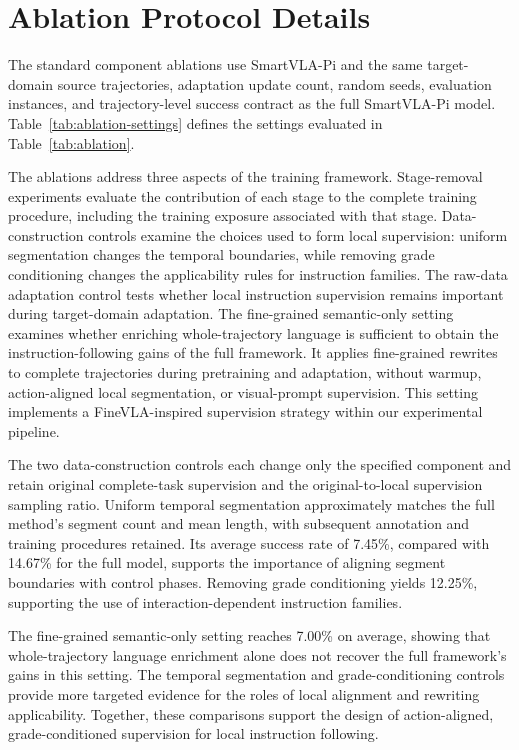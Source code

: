\section{Ablation Protocol Details}
\label{appendix:ablation-details}

The standard component ablations use SmartVLA-Pi and the same
target-domain source trajectories, adaptation update count,
random seeds, evaluation instances, and trajectory-level success
contract as the full SmartVLA-Pi model. Table~\ref{tab:ablation-settings}
defines the settings evaluated in Table~\ref{tab:ablation}.

The ablations address three aspects of the training framework.
Stage-removal experiments evaluate the contribution of each
stage to the complete training procedure, including the training
exposure associated with that stage. Data-construction controls
examine the choices used to form local supervision: uniform
segmentation changes the temporal boundaries, while removing
grade conditioning changes the applicability rules for instruction
families. The raw-data adaptation control tests whether local
instruction supervision remains important during target-domain
adaptation. The fine-grained semantic-only setting examines whether
enriching whole-trajectory language is sufficient to obtain the
instruction-following gains of the full framework. It applies
fine-grained rewrites to complete trajectories during pretraining
and adaptation, without warmup, action-aligned local segmentation,
or visual-prompt supervision. This setting implements a
FineVLA-inspired supervision strategy within our experimental
pipeline.

%

The two data-construction controls each change only the specified
component and retain original complete-task supervision and the
original-to-local supervision sampling ratio. Uniform temporal
segmentation approximately matches the full method's segment
count and mean length, with subsequent annotation and training
procedures retained. Its average success rate of 7.45\%, compared
with 14.67\% for the full model, supports the importance of
aligning segment boundaries with control phases. Removing grade
conditioning yields 12.25\%, supporting the use of
interaction-dependent instruction families.

The fine-grained semantic-only setting reaches 7.00\% on average,
showing that whole-trajectory language enrichment alone does not
recover the full framework's gains in this setting. The temporal
segmentation and grade-conditioning controls provide more
targeted evidence for the roles of local alignment and rewriting
applicability. Together, these comparisons support the design
of action-aligned, grade-conditioned supervision for local
instruction following.

